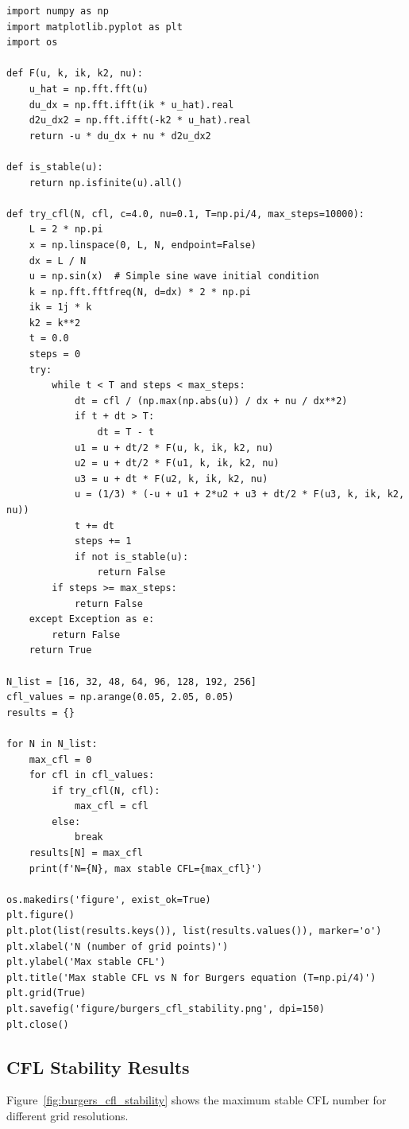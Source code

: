 \documentclass{article}
\begin{document}
\begin{lstlisting}
import numpy as np
import matplotlib.pyplot as plt
import os

def F(u, k, ik, k2, nu):
    u_hat = np.fft.fft(u)
    du_dx = np.fft.ifft(ik * u_hat).real
    d2u_dx2 = np.fft.ifft(-k2 * u_hat).real
    return -u * du_dx + nu * d2u_dx2

def is_stable(u):
    return np.isfinite(u).all()

def try_cfl(N, cfl, c=4.0, nu=0.1, T=np.pi/4, max_steps=10000):
    L = 2 * np.pi
    x = np.linspace(0, L, N, endpoint=False)
    dx = L / N
    u = np.sin(x)  # Simple sine wave initial condition
    k = np.fft.fftfreq(N, d=dx) * 2 * np.pi
    ik = 1j * k
    k2 = k**2
    t = 0.0
    steps = 0
    try:
        while t < T and steps < max_steps:
            dt = cfl / (np.max(np.abs(u)) / dx + nu / dx**2)
            if t + dt > T:
                dt = T - t
            u1 = u + dt/2 * F(u, k, ik, k2, nu)
            u2 = u + dt/2 * F(u1, k, ik, k2, nu)
            u3 = u + dt * F(u2, k, ik, k2, nu)
            u = (1/3) * (-u + u1 + 2*u2 + u3 + dt/2 * F(u3, k, ik, k2, nu))
            t += dt
            steps += 1
            if not is_stable(u):
                return False
        if steps >= max_steps:
            return False
    except Exception as e:
        return False
    return True

N_list = [16, 32, 48, 64, 96, 128, 192, 256]
cfl_values = np.arange(0.05, 2.05, 0.05)
results = {}

for N in N_list:
    max_cfl = 0
    for cfl in cfl_values:
        if try_cfl(N, cfl):
            max_cfl = cfl
        else:
            break
    results[N] = max_cfl
    print(f'N={N}, max stable CFL={max_cfl}')

os.makedirs('figure', exist_ok=True)
plt.figure()
plt.plot(list(results.keys()), list(results.values()), marker='o')
plt.xlabel('N (number of grid points)')
plt.ylabel('Max stable CFL')
plt.title('Max stable CFL vs N for Burgers equation (T=np.pi/4)')
plt.grid(True)
plt.savefig('figure/burgers_cfl_stability.png', dpi=150)
plt.close()
\end{lstlisting}

\subsection*{CFL Stability Results}
Figure~\ref{fig:burgers_cfl_stability} shows the maximum stable CFL number for different grid resolutions.
\end{document}
